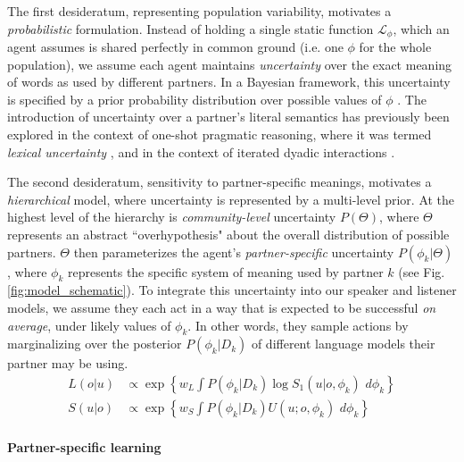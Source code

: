 The first desideratum, representing population variability, motivates a \emph{probabilistic} formulation.
Instead of holding a single static function $\mathcal{L}_{\phi}$, which an agent assumes is shared perfectly in common ground (i.e. one $\phi$ for the whole population), we assume each agent maintains \emph{uncertainty} over the exact meaning of words as used by different partners.
In a Bayesian framework, this uncertainty is specified by a prior probability distribution over possible values of $\phi$ .
The introduction of uncertainty over a partner's literal semantics has previously been explored in the context of one-shot pragmatic reasoning, where it was termed \emph{lexical uncertainty} \cite{bergen_pragmatic_2016}, and in the context of iterated dyadic interactions \cite{smith_learning_2013}. 

The second desideratum, sensitivity to partner-specific meanings, motivates a \emph{hierarchical} model, where uncertainty is represented by a multi-level prior. 
At the highest level of the hierarchy is \emph{community-level} uncertainty $P(\Theta)$, where $\Theta$ represents an abstract ``overhypothesis" about the overall distribution of possible partners. 
$\Theta$ then parameterizes the agent's \emph{partner-specific} uncertainty $P(\phi_{k} | \Theta)$, where $\phi_k$ represents the specific system of meaning used by partner $k$ (see Fig. \ref{fig:model_schematic}). 
To integrate this uncertainty into our speaker and listener models, we assume they each act in a way that is expected to be successful \emph{on average}, under likely values of $\phi_k$.
In other words, they sample actions by marginalizing over the posterior $P(\phi_k | D_k)$ of different language models their partner may be using.
\begin{align}
L(o|u) &\propto   \exp\left\{w_L \textstyle{\int} P(\phi_k | D_k)  \log S_1(u|o, \phi_k)\,\,d\phi_k\right\}\label{eq:marginalized}\\
S(u|o) &\propto  \exp\left\{w_S \textstyle{\int} P(\phi_k | D_k)  U(u; o, \phi_k) \,\,d\phi_k\right\}\nonumber
\end{align}

\paragraph{Partner-specific learning}

